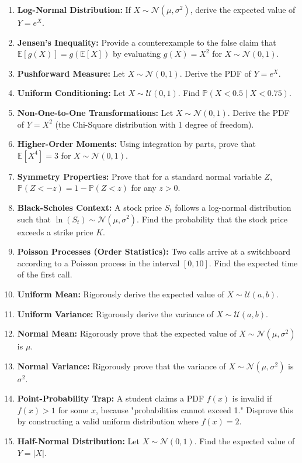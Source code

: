 \documentclass[11pt, a4paper]{article}
\theoremstyle{definition}
\theoremstyle{remark}
\newcommand{\E}{\mathbb{E}}
\newcommand{\Prob}{\mathbb{P}}
\begin{document}
\begin{enumerate}[label=\textbf{\arabic*.}, leftmargin=*]
    \item \textbf{Log-Normal Distribution:} If $X \sim \mathcal{N}(\mu, \sigma^2)$, derive the expected value of $Y = e^X$.
    \item \textbf{Jensen's Inequality:} Provide a counterexample to the false claim that $\E[g(X)] = g(\E[X])$ by evaluating $g(X) = X^2$ for $X \sim \mathcal{N}(0, 1)$.
    \item \textbf{Pushforward Measure:} Let $X \sim \mathcal{N}(0, 1)$. Derive the PDF of $Y = e^X$.
    \item \textbf{Uniform Conditioning:} Let $X \sim \mathcal{U}(0, 1)$. Find $\Prob(X < 0.5 \mid X < 0.75)$.
    \item \textbf{Non-One-to-One Transformations:} Let $X \sim \mathcal{N}(0, 1)$. Derive the PDF of $Y = X^2$ (the Chi-Square distribution with 1 degree of freedom).
    \item \textbf{Higher-Order Moments:} Using integration by parts, prove that $\E[X^4] = 3$ for $X \sim \mathcal{N}(0, 1)$.
    \item \textbf{Symmetry Properties:} Prove that for a standard normal variable $Z$, $\Prob(Z < -z) = 1 - \Prob(Z < z)$ for any $z > 0$.
    \item \textbf{Black-Scholes Context:} A stock price $S_t$ follows a log-normal distribution such that $\ln(S_t) \sim \mathcal{N}(\mu, \sigma^2)$. Find the probability that the stock price exceeds a strike price $K$.
    \item \textbf{Poisson Processes (Order Statistics):} Two calls arrive at a switchboard according to a Poisson process in the interval $[0, 10]$. Find the expected time of the first call.
    \item \textbf{Uniform Mean:} Rigorously derive the expected value of $X \sim \mathcal{U}(a, b)$.
    \item \textbf{Uniform Variance:} Rigorously derive the variance of $X \sim \mathcal{U}(a, b)$.
    \item \textbf{Normal Mean:} Rigorously prove that the expected value of $X \sim \mathcal{N}(\mu, \sigma^2)$ is $\mu$.
    \item \textbf{Normal Variance:} Rigorously prove that the variance of $X \sim \mathcal{N}(\mu, \sigma^2)$ is $\sigma^2$.
    \item \textbf{Point-Probability Trap:} A student claims a PDF $f(x)$ is invalid if $f(x) > 1$ for some $x$, because "probabilities cannot exceed 1." Disprove this by constructing a valid uniform distribution where $f(x) = 2$.
    \item \textbf{Half-Normal Distribution:} Let $X \sim \mathcal{N}(0, 1)$. Find the expected value of $Y = |X|$.

\end{enumerate}
\end{document}
